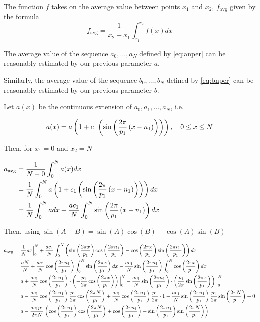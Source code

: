 \begin{definition}
The function $f$ takes on the average value between points $x_1$ and $x_2$, $f_{\text{avg}}$  given by the formula 
\begin{equation} \label{eq:avgvalue}
    f_{\text{avg}} = \frac1{x_2-x_1} \int_{x_1}^{x_2} f(x)dx
\end{equation}
\end{definition}

\begin{prop}\label{thm:avgparam}
The average value of the sequence $a_0,\dots,a_N$ defined by \ref{eq:anper} can be reasonably estimated by our previous parameter $a$.

Similarly, the average value of the sequence $b_0,\dots,b_N$ defined by \ref{eq:bnper} can be reasonably estimated by our previous parameter $b$.

\begin{pf}
Let $a(x)$ be the continuous extension of $a_0,a_1,\dots,a_N$, i.e. 

\begin{equation} \label{eq:axfn}
    a(x)=a\left(1+c_1\left(\sin\left(\frac{2\pi}{p_1}\left(x-n_1\right)\right)\right)\right),\quad 0\leq x \leq N
\end{equation}

Then, for $x_1=0$ and $x_2=N$

$\begin{aligned}
a_{\text{avg}} 
&= \frac{1}{N-0}\int_0^N a(x)dx \\
&= \frac{1}{N}\int_0^N a\left(1+c_1\left(\sin\left(\frac{2\pi}{p_1}\left(x-n_1\right)\right)\right)\right)dx\\
&= \frac1N \int_0^N a dx +  \frac{ac_1}{N} \int_0^N \sin\left(\frac{2\pi}{p_1}\left(x-n_1\right)\right) dx
\end{aligned}$

Then, using  $\sin(A-B) = \sin(A)\cos(B) - \cos(A)\sin(B)$

$\begin{aligned}
a_{\text{avg}} 
&= \frac1N ax\Big|_0^N  + \frac{ac_1}{N} \int_0^N \left(\sin\left(\frac{2\pi x}{p_1}\right)\cos\left(\frac{2\pi n_1}{p_1}\right) - \cos\left(\frac{2\pi x}{p_1}\right)\sin\left(\frac{2\pi n_1}{p_1}\right)\right)dx\\
&= \frac{aN}{N}  
+ \frac{ac_1}{N} \cos\left(\frac{2\pi n_1}{p_1}\right) \int_0^N \sin\left(\frac{2\pi x}{p_1}\right)dx 
-   \frac{ac_1}{N} \sin\left(\frac{2\pi n_1}{p_1}\right) \int_0^N \cos\left(\frac{2\pi x}{p_1}\right)dx\\
&= a 
+  \frac{ac_1}{N} \cos\left(\frac{2\pi n_1}{p_1}\right)  \cdot \left(- \frac{p_1}{2\pi}  \cos\left(\frac{2\pi x}{p_1}\right)\right)\Big|_0^N 
-   \frac{ac_1}{N} \sin\left(\frac{2\pi n_1}{p_1}\right)  \cdot \left( \frac{p_1}{2\pi}  \sin\left(\frac{2\pi x}{p_1}\right)\right)\Big|_0^N \\
&= a 
-\frac{ac_1}{N} \cos\left(\frac{2\pi n_1}{p_1}\right) \frac{p_1}{2\pi} \cos\left(\frac{2\pi N}{p_1}\right) 
+\frac{ac_1}{N}\cos\left(\frac{2\pi n_1}{p_1}\right) \frac{p_1}{2\pi}  \cdot 1
-\frac{ac_1}{N} \sin\left(\frac{2\pi n_1}{p_1}\right) \frac{p_1}{2\pi}  \sin\left(\frac{2\pi N}{p_1}\right)
+0\\
&= a 
-\frac{ac_1 p_1}{2\pi N} \left(\cos\left(\frac{2\pi n_1}{p_1}\right)\cos\left(\frac{2\pi N}{p_1}\right) 
+\cos\left(\frac{2\pi n_1}{p_1}\right) 
-\sin\left(\frac{2\pi n_1}{p_1}\right)  \sin\left(\frac{2\pi N}{p_1}\right)\right)
\end{aligned}$



\end{pf}
\end{prop}
